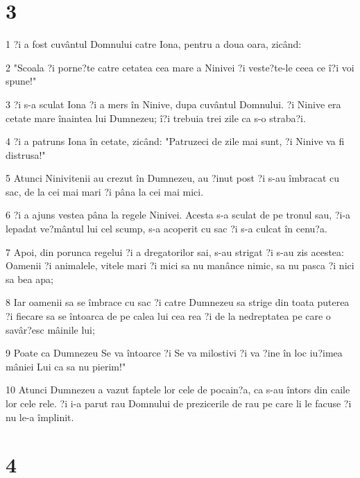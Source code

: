 \chapter{3}

\par 1 ?i a fost cuvântul Domnului catre Iona, pentru a doua oara, zicând:
\par 2 "Scoala ?i porne?te catre cetatea cea mare a Ninivei ?i veste?te-le ceea ce î?i voi spune!"
\par 3 ?i s-a sculat Iona ?i a mers în Ninive, dupa cuvântul Domnului. ?i Ninive era cetate mare înaintea lui Dumnezeu; î?i trebuia trei zile ca s-o straba?i.
\par 4 ?i a patruns Iona în cetate, zicând: "Patruzeci de zile mai sunt, ?i Ninive va fi distrusa!"
\par 5 Atunci Ninivitenii au crezut în Dumnezeu, au ?inut post ?i s-au îmbracat cu sac, de la cei mai mari ?i pâna la cei mai mici.
\par 6 ?i a ajuns vestea pâna la regele Ninivei. Acesta s-a sculat de pe tronul sau, ?i-a lepadat ve?mântul lui cel scump, s-a acoperit cu sac ?i s-a culcat în cenu?a.
\par 7 Apoi, din porunca regelui ?i a dregatorilor sai, s-au strigat ?i s-au zis acestea: Oamenii ?i animalele, vitele mari ?i mici sa nu manânce nimic, sa nu pasca ?i nici sa bea apa;
\par 8 Iar oamenii sa se îmbrace cu sac ?i catre Dumnezeu sa strige din toata puterea ?i fiecare sa se întoarca de pe calea lui cea rea ?i de la nedreptatea pe care o savâr?esc mâinile lui;
\par 9 Poate ca Dumnezeu Se va întoarce ?i Se va milostivi ?i va ?ine în loc iu?imea mâniei Lui ca sa nu pierim!"
\par 10 Atunci Dumnezeu a vazut faptele lor cele de pocain?a, ca s-au întors din caile lor cele rele. ?i i-a parut rau Domnului de prezicerile de rau pe care li le facuse ?i nu le-a împlinit.

\chapter{4}

